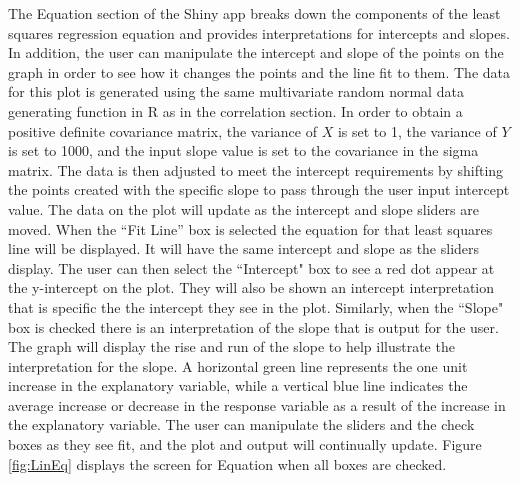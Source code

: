 \documentclass[11pt]{book}
\begin{document}
The Equation section of the Shiny app breaks down the components of the least squares regression equation and provides interpretations for intercepts and slopes.  In addition, the user can manipulate the intercept and slope of the points on the graph in order to see how it changes the points and the line fit to them.  The data for this plot is generated using the same multivariate random normal data generating function in R as in the correlation section. In order to obtain a positive definite covariance matrix, the variance of $X$ is set to 1, the variance of $Y$ is set to 1000, and the input slope value is set to the covariance in the sigma matrix. The data is then adjusted to meet the intercept requirements by shifting the points created with the specific slope to pass through the user input intercept value. The data on the plot will update as the intercept and slope sliders are moved.  When the  ``Fit Line'' box is selected the equation for that least squares line will be displayed. It will have the same intercept and slope as the sliders display. The user can then select the ``Intercept" box to see a red dot appear at the y-intercept on the plot. They will also be shown an intercept interpretation that is specific the the intercept they see in the plot. Similarly, when the ``Slope" box is checked there is an interpretation of the slope that is output for the user.  The graph will display the rise and run of the slope to help illustrate the interpretation for the slope. A horizontal green line represents the one unit increase in the explanatory variable, while a vertical blue line indicates the average increase or decrease in the response variable as a result of the increase in the explanatory variable. The user can manipulate the sliders and the check boxes as they see fit, and the plot and output will continually update. Figure \ref{fig:LinEq} displays the screen for Equation when all boxes are checked. 
\end{document}
